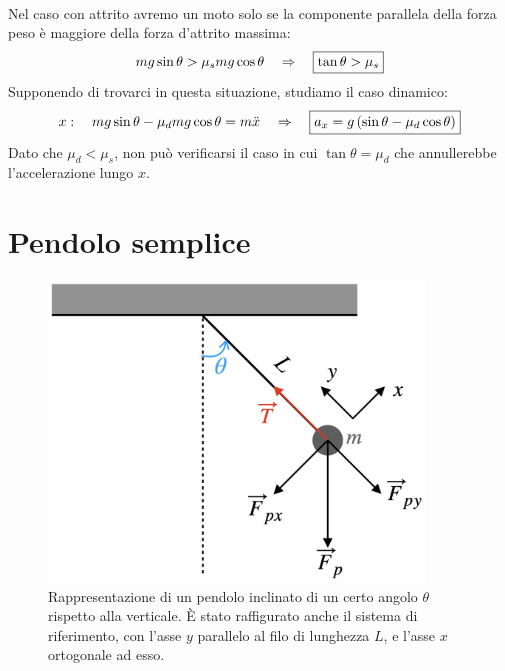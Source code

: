 \\
Nel caso con attrito avremo un moto solo se la componente parallela della
forza peso è maggiore della forza d'attrito massima:
\begin{equation}
    mg\sin\theta > \mu_s mg\cos\theta\quad\Rightarrow\quad \boxed{\tan\theta>\mu_s}
\end{equation}
Supponendo di trovarci in questa situazione, studiamo il caso dinamico:
\begin{equation}
    x:\quad mg\sin\theta -\mu_d mg\cos\theta = m\ddot x\quad\Rightarrow\quad
    \boxed{a_x = g\left(\sin\theta-\mu_d\cos\theta\right)}
\end{equation}
Dato che $\mu_d<\mu_s$, non può verificarsi il caso in cui $\tan\theta
=\mu_d$ che annullerebbe l'accelerazione lungo $x$.

\section{Pendolo semplice}
\begin{figure}[htbp]
\center
        \includegraphics[width=10cm]{images/pendolo.png}
        \caption{Rappresentazione di un pendolo inclinato di un certo angolo
        $\theta$ rispetto alla verticale. È stato raffigurato anche il sistema
        di riferimento, con l'asse $y$ parallelo al filo di lunghezza $L$, e
        l'asse $x$ ortogonale ad esso.}
\label{fig:Iplain&pendulum:pendulum}
\end{figure}

